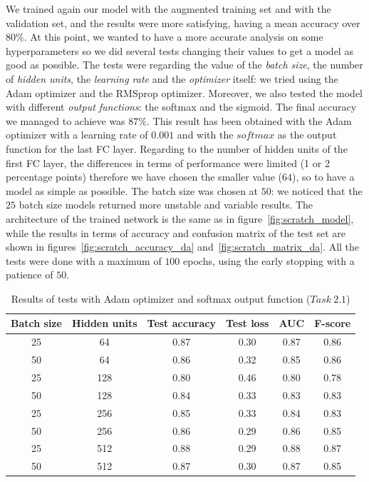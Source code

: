 \documentclass[11pt,a4paper,oneside]{article}
\begin{document}
We trained again our model with the augmented training set and with the validation set, and the results were more satisfying, having a mean accuracy over $80\%$. At this point, we wanted to have a more accurate analysis on some hyperparameters so we did several tests changing their values to get a model as good as possible. 
The tests were regarding the value of the \textit{batch size}, the number of \textit{hidden units}, the \textit{learning rate} and the \textit{optimizer} itself: we tried using the Adam optimizer and the RMSprop optimizer. Moreover, we also tested the model with different \textit{output functions}: the softmax and the sigmoid. 
The final accuracy we managed to achieve was $87\%$. This result has been obtained with the   Adam optimizer with a learning rate of $0.001$ and with the $softmax$ as the output function for the last FC layer. Regarding to the number of hidden units of the first FC layer, the differences in terms of performance were limited (1 or 2 percentage points) therefore we have chosen the smaller value ($64$), so to have a model as simple as possible. The batch size was chosen at $50$: we noticed that the $25$ batch size models returned more unstable and variable results. The architecture of the trained network is the same as in figure~\ref{fig:scratch_model}, while the results in terms of accuracy and confusion matrix of the test set are shown in figures~\ref{fig:scratch_accuracy_da} and~\ref{fig:scratch_matrix_da}.
All the tests were done with a maximum of $100$ epochs, using the early stopping with a patience of $50$.

\begin{table}[h]
\centering
\begin{tabular}{|cccccc|}
\hline
Batch size & Hidden units & Test accuracy & Test loss & AUC & F-score \\
\hline
25 & 64 & 0.87 & 0.30 & 0.87 & 0.86 \\ 
50 & 64 & 0.86 & 0.32 & 0.85 & 0.86 \\ 
25 & 128 & 0.80 & 0.46 & 0.80 & 0.78 \\ 
50 & 128 & 0.84 & 0.33 & 0.83 & 0.83 \\ 
25 & 256 & 0.85 & 0.33 & 0.84 & 0.83 \\ 
50 & 256 & 0.86 & 0.29 & 0.86 & 0.85 \\ 
25 & 512 & 0.88 & 0.29 & 0.88 & 0.87 \\ 
50 & 512 & 0.87 & 0.30 & 0.87 & 0.85 \\
\hline
\end{tabular}
\caption{Results of tests with Adam optimizer and softmax output function ($Task\ 2.1$)}
\end{table}
\end{document}
